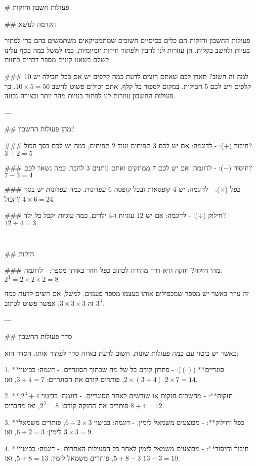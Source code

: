 # פעולות חשבון וחזקות

## הקדמה לנושא

פעולות החשבון וחזקות הם כלים בסיסיים חשובים שמתמטיקאים משתמשים בהם כדי לפתור בעיות ולחשב בקלות. הן עוזרות לנו להבין ולפתור חידות יומיומיות, כמו למשל כמה כסף עלינו לשלם כשאנו קונים מספר דברים בחנות.

### למה זה חשוב?
תארו לכם שאתם רוצים לדעת כמה קלפים יש אם בכל חבילה יש 10 קלפים ויש לכם 5 חבילות. במקום לספור כל קלף, אתם יכולים פשוט לחשב $10 \times 5 = 50$. כך פעולות החשבון עוזרות לנו לפתור בעיות מהר יותר ובצורה נכונה.

---

## מהן פעולות החשבון?

### חיבור ($+$):
- לדוגמה: אם יש לכם 3 תפוחים ועוד 2 תפוחים, כמה יש לכם בסך הכול? $3 + 2 = 5$

### חיסור ($-$):
- לדוגמה: אם יש לכם 7 ממתקים ואתם נותנים 3 לחבר, כמה נשאר לכם? $7 - 3 = 4$

### כפל ($\times$):
- לדוגמה: יש 4 קופסאות ובכל קופסה 6 עפרונות. כמה עפרונות יש בסך הכול? $4 \times 6 = 24$

### חילוק ($\div$):
- לדוגמה: אם יש 12 עוגיות ו-4 ילדים, כמה עוגיות יקבל כל ילד? $12 \div 4 = 3$

---

## חזקות

### מהי חזקה?
חזקה היא דרך מהירה לכתוב כפל חוזר באותו מספר:
- לדוגמה: $2^3 = 2 \times 2 \times 2 = 8$

זה עוזר כאשר יש מספר שמכפילים אותו בעצמו מספר פעמים. למשל, אם רוצים לדעת כמה זה $3 \times 3 \times 3$, אפשר פשוט לכתוב $3^3$.

---

## סדר פעולות החשבון

כאשר יש ביטוי עם כמה פעולות שונות, חשוב לדעת באיזה סדר לפתור אותו. הסדר הוא:

1. **סוגריים** ($()$): 
   - פתרון קודם כל של מה שבתוך הסוגריים.
   - דוגמה: בביטוי $2 \times (3 + 4)$, פותרים קודם את הסוגריים: $3 + 4 = 7$, ואז $2 \times 7 = 14$.

2. **חזקות**:
   - מחשבים חזקות או שורשים לאחר הסוגריים.
   - דוגמה: בביטוי $2^3 + 4$, פותרים את החזקה קודם: $2^3 = 8$, ואז מחברים $8 + 4 = 12$.

3. **כפל וחילוק**:
   - מבוצעים משמאל לימין.
   - דוגמה: בביטוי $6 \div 2 \times 3$, פותרים משמאל לימין: $6 \div 2 = 3$, ואז $3 \times 3 = 9$.

4. **חיבור וחיסור**:
   - מבוצעים משמאל לימין לאחר כל הפעולות האחרות.
   - דוגמה: בביטוי $5 + 8 - 3$, פותרים משמאל לימין: $5 + 8 = 13$, ואז $13 - 3 = 10$.


